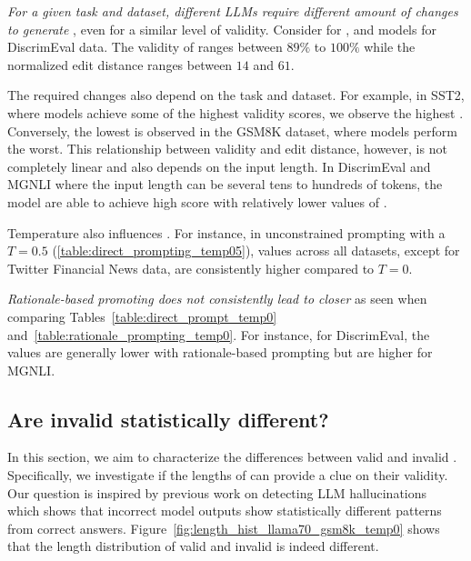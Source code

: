 \textit{For a given task and dataset, different LLMs require different amount of changes to generate \SCEs}, even for a similar level of validity. Consider for \mistralM, \llamaS and \llamaM models for DiscrimEval data. The validity of \SCEs ranges between $89\%$ to $100\%$ while the normalized edit distance ranges between $14$ and $61$. 

The required changes also depend on the task and dataset. For example, in SST2, where models achieve some of the highest validity scores, we observe the highest \ED.
Conversely, the lowest \ED is observed in the GSM8K dataset, where models perform the worst.
This relationship between validity and edit distance, however, is not completely linear and also depends on the input length.
In DiscrimEval and MGNLI where the input length can be several tens to hundreds of tokens, the model are able to achieve high \Val score with relatively lower values of \ED.


Temperature also influences \ED. For instance, in unconstrained prompting with a $T=0.5$ (\autoref{table:direct_prompting_temp05}), \ED values across all datasets, except for Twitter Financial News data, are consistently higher compared to $T=0$.

\textit{Rationale-based promoting does not consistently lead to closer \SCEs} as seen when comparing Tables~\ref{table:direct_prompt_temp0} and~\ref{table:rationale_prompting_temp0}. For instance, for DiscrimEval, the \ED values are generally lower with rationale-based prompting but are higher for MGNLI. 















\subsection*{Are invalid \SCEs statistically different?}
In this section, we aim to characterize the differences between valid and invalid \SCEs. Specifically, we investigate if the lengths of \SCEs can provide a clue on their validity. Our question is inspired by previous work on detecting LLM hallucinations~\cite{hallucination_snowball,snyder_early_2024,azaria-mitchell-2023-internal} which shows that incorrect model outputs show statistically different patterns from correct answers. Figure~\ref{fig:length_hist_llama70_gsm8k_temp0} shows that the length distribution of valid and invalid \SCEs is indeed different.

